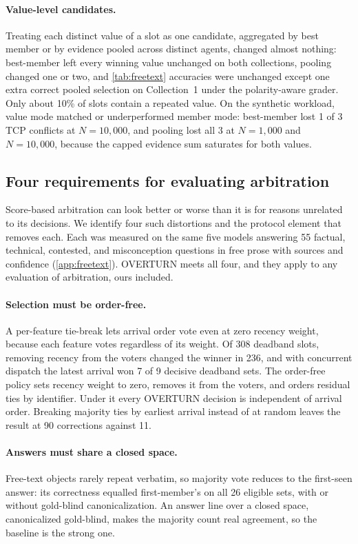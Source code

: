 \paragraph{Value-level candidates.} Treating each distinct value of a slot as one candidate, aggregated by best member or by evidence pooled across distinct agents, changed almost nothing: best-member left every winning value unchanged on both collections, pooling changed one or two, and \cref{tab:freetext} accuracies were unchanged except one extra correct pooled selection on Collection~1 under the polarity-aware grader. Only about 10\% of slots contain a repeated value. On the synthetic workload, value mode matched or underperformed member mode: best-member lost 1 of 3 TCP conflicts at $N = 10{,}000$, and pooling lost all 3 at $N = 1{,}000$ and $N = 10{,}000$, because the capped evidence sum saturates for both values.

\subsection{Four requirements for evaluating arbitration}
\label{sec:freetext}

Score-based arbitration can look better or worse than it is for reasons unrelated to its decisions. We identify four such distortions and the protocol element that removes each. Each was measured on the same five models answering 55 factual, technical, contested, and misconception questions in free prose with sources and confidence (\cref{app:freetext}). OVERTURN meets all four, and they apply to any evaluation of arbitration, ours included.

\paragraph{Selection must be order-free.} A per-feature tie-break lets arrival order vote even at zero recency weight, because each feature votes regardless of its weight. Of 308 deadband slots, removing recency from the voters changed the winner in 236, and with concurrent dispatch the latest arrival won 7 of 9 decisive deadband sets. The order-free policy sets recency weight to zero, removes it from the voters, and orders residual ties by identifier. Under it every OVERTURN decision is independent of arrival order. Breaking majority ties by earliest arrival instead of at random leaves the result at 90 corrections against 11.

\paragraph{Answers must share a closed space.} Free-text objects rarely repeat verbatim, so majority vote reduces to the first-seen answer: its correctness equalled first-member's on all 26 eligible sets, with or without gold-blind canonicalization. An answer line over a closed space, canonicalized gold-blind, makes the majority count real agreement, so the baseline is the strong one.

